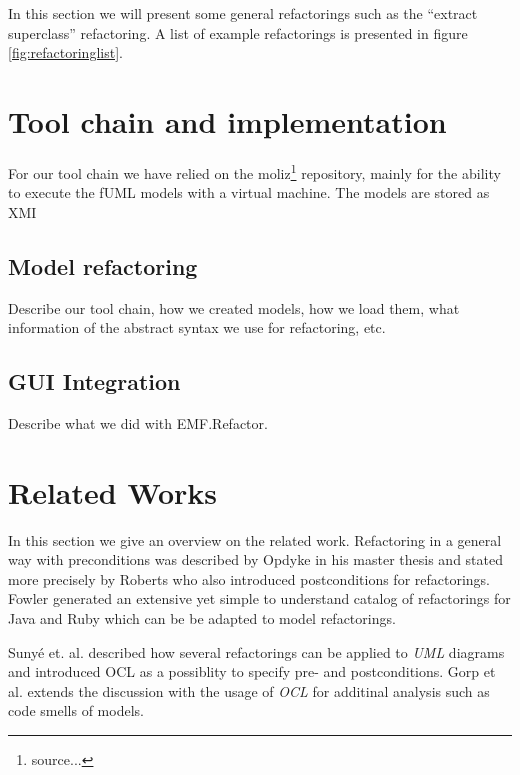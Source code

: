 \documentclass{llncs}
\begin{document}
In this section we will present some general refactorings such as the ``extract superclass'' refactoring. A list of example refactorings
is presented in figure \ref{fig:refactoringlist}.

\section{Tool chain and implementation}
For our tool chain we have relied on the moliz\footnote{source...} repository, mainly for the ability to execute the fUML models with
a virtual machine. The models are stored as XMI 

\subsection{Model refactoring}
Describe our tool chain, how we created models, how we load them, what information of the abstract syntax we use for refactoring, etc.

\subsection{GUI Integration}
Describe what we did with EMF.Refactor.

\section{Related Works}

In this section we give an overview on the related work. Refactoring in a general way with preconditions was described
by Opdyke \cite{mast:REFOOF} in his master thesis and stated more precisely by Roberts \cite{rob99} who also introduced
postconditions for refactorings. Fowler \cite{fow99} generated an extensive yet simple to understand catalog of
refactorings for Java and Ruby which can be be adapted to model refactorings.


Suny{\'e} et. al. \cite{DBLP:conf/uml/SunyePTJ01} described how several refactorings can be applied to \textit{UML}
diagrams and introduced OCL as a possiblity to specify pre- and postconditions. Gorp et al. \cite{gorp03} extends the
discussion with the usage of \textit{OCL} for additinal analysis such as code smells of models.
\end{document}
